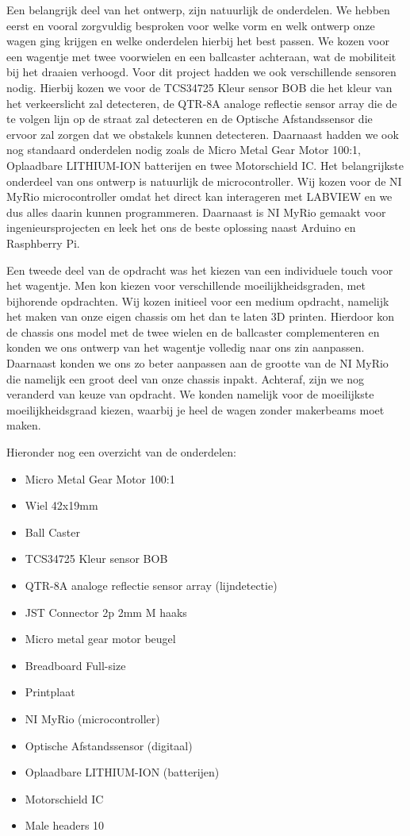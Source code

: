 \documentclass[kulak]{kulakarticle} %
\begin{document}
Een belangrijk deel van het ontwerp, zijn natuurlijk de onderdelen. We hebben eerst en vooral zorgvuldig besproken voor welke vorm en welk ontwerp onze wagen ging krijgen en welke onderdelen hierbij het best passen. We kozen voor een wagentje met twee voorwielen en een ballcaster achteraan, wat de mobiliteit bij het draaien verhoogd. Voor dit project hadden we ook verschillende sensoren nodig. Hierbij kozen we voor de TCS34725 Kleur sensor BOB die het kleur van het verkeerslicht zal detecteren, de QTR-8A analoge reflectie sensor array die de te volgen lijn op de straat zal detecteren en de Optische Afstandssensor die ervoor zal zorgen dat we obstakels kunnen detecteren. Daarnaast hadden we ook nog standaard onderdelen nodig zoals de Micro Metal Gear Motor 100:1, Oplaadbare LITHIUM-ION batterijen en twee Motorschield IC. Het belangrijkste onderdeel van ons ontwerp is natuurlijk de microcontroller. Wij kozen voor de NI MyRio microcontroller omdat het direct kan interageren met LABVIEW en we dus alles daarin kunnen programmeren. Daarnaast is NI MyRio gemaakt voor ingenieursprojecten en leek het ons de beste oplossing naast Arduino en Rasphberry Pi.  


Een tweede deel van de opdracht was het kiezen van een individuele touch voor het wagentje. Men kon kiezen voor verschillende moeilijkheidsgraden, met bijhorende opdrachten. Wij kozen initieel voor een medium opdracht, namelijk het maken van onze eigen chassis om het dan te laten 3D printen. Hierdoor kon de chassis ons model met de twee wielen en de ballcaster complementeren en konden we ons ontwerp van het wagentje volledig naar ons zin aanpassen. Daarnaast konden we ons zo beter aanpassen aan de grootte van de NI MyRio die namelijk een groot deel van onze chassis inpakt. Achteraf, zijn we nog veranderd van keuze van opdracht. We konden namelijk voor de moeilijkste moeilijkheidsgraad kiezen, waarbij je heel de wagen zonder makerbeams moet maken. 

Hieronder nog een overzicht van de onderdelen:
\begin{itemize}
	\item Micro Metal Gear Motor 100:1
	\item Wiel 42x19mm
	\item Ball Caster
	\item TCS34725 Kleur sensor BOB 
	\item QTR-8A analoge reflectie sensor array (lijndetectie)
	\item JST Connector 2p 2mm M haaks
	\item Micro metal gear motor beugel
	\item Breadboard Full-size
	\item Printplaat
	\item NI MyRio (microcontroller)
	\item Optische Afstandssensor (digitaal)
	\item Oplaadbare LITHIUM-ION (batterijen)
	\item Motorschield IC
	\item Male headers 10
\end{itemize}
\end{document}
